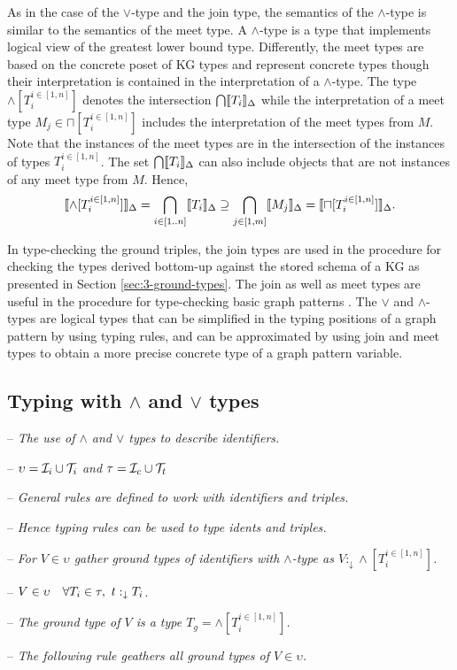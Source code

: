 \documentclass[runningheads]{llncs}
\newcommand{\darr}{\downarrow}
\newcommand{\llb}{\llbracket}
\newcommand{\rrb}{\rrbracket}
\newcommand{\I}{{\cal I}}
\newcommand{\T}{{\cal T}}
\newcommand{\notes}[1]{\noindent\begin{small}-- \emph{#1}\hfill\break\end{small}}
\newcommand{\nnotes}[1]{\indent\begin{small}-- \emph{#1}\hfill\break\end{small}}
\newcommand{\ennotes}[1]{\indent\begin{small}-- \emph{#1}\hfill\end{small}}
\begin{document}
As in the case of the $\lor$-type and the join type, the semantics of
the $\land$-type is similar to the semantics of the meet type. A
$\land$-type is a type that implements logical view of the greatest
lower bound type. Differently, the meet types are based on the
concrete poset of KG types and represent concrete types though their
interpretation is contained in the interpretation of a
$\land$-type. The type $\land[T_i^{i\in[1,n]}]$ denotes the
intersection $\bigcap\/\llb\/T_i\rrb_\D$ while the interpretation of a
meet type $M_j\in\sqcap[T_i^{i\in[1,n]}]$ includes the interpretation
of the meet types from $M$. Note that the instances of the meet types
are in the intersection of the instances of types
$T_i^{i\in[1,n]}$. The set $\bigcap\/\llb\/T_i\rrb_\D$ can also
include objects that are not instances of any meet type from
$M$. Hence,
$$\llb\land[T_i^{i\in[1,n]}]\rrb_\D=\bigcap_{i\in[1..n]}\/\llb\/T_i\rrb_\D\supseteq\bigcap_{j\in[1,m]}\llb\/M_j\rrb_\D=\llb\sqcap[T_i^{i\in[1,n]}]\rrb_\D.$$

In type-checking the ground triples, the join types are used in the
procedure for checking the types derived bottom-up against the stored
schema of a KG as presented in Section \ref{sec:3-ground-types}. The
join as well as meet types are useful in the procedure for
type-checking basic graph patterns \cite{Savnik2025a}. The $\lor$ and
$\land$-types are logical types that can be simplified in the typing
positions of a graph pattern by using typing rules, and can be
approximated by using join and meet types to obtain a more precise
concrete type of a graph pattern variable.




\subsection{Typing with $\land$ and $\lor$ types}

\medskip
\notes{The use of $\land$ and $\lor$ types to describe identifiers.}
\nnotes{$\upsilon=\I_i\cup\T_i$ and $\tau=\I_c\cup\T_t$}
\nnotes{General rules are defined to work with identifiers and triples.}
\nnotes{Hence typing rules can be used to type idents and triples.}

\notes{For $V\in\upsilon$ gather ground types of identifiers with $\land$-type as $V:_{\darr}\land[T_i^{i\in[1,n]}]$.}
\nnotes{$V\in\upsilon\quad\forall\/T_i\in\tau,\ t:_{\darr}T_i$.}
\nnotes{The ground type of $V$ is a type $T_g=\land[T_i^{i\in[1,n]}]$.}
\ennotes{The following rule geathers all ground types of $V\in\upsilon$.}
\end{document}
